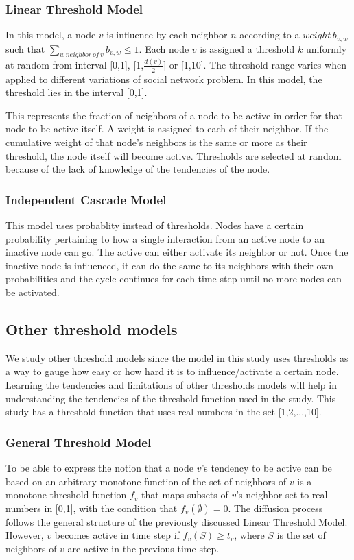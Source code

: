 \subsubsection{Linear Threshold Model}
In this model, a node $v$ is influence by each neighbor $n$ according to a $weight\, b_{v,w}$ such that $\sum_{w\, neighbor\, of\, v} b_{v,w}\leq{1}$.\cite{Kempe} Each node $v$ is assigned a threshold $k$ uniformly at random from interval [0,1], [1,$\frac{d(v)}{2}$] or [1,10].\cite{chen} The threshold range varies when applied to different variations of social network problem. In this model, the threshold lies in the interval [0,1]. 

This represents the fraction of neighbors of a node to be active in order for that node to be active itself.  A weight is assigned to each of their neighbor. If the cumulative weight of that node's neighbors is the same or more as their threshold, the node itself will become active. Thresholds are selected at random because of the lack of knowledge of the tendencies of the node.\cite{Kempe} 
\subsubsection{Independent Cascade Model}
This model uses probablity instead of thresholds. Nodes have a  certain probability pertaining to how a single interaction from an active node to an inactive node can go. The active can either activate its neighbor or not. Once the inactive node is influenced, it can do the same to its neighbors with their own probabilities and the cycle continues for each time step until no more nodes can be activated.\cite{Kempe}
\subsection{Other threshold models}
We study other threshold models since the model in this study uses thresholds as a way to gauge how easy or how hard it is to influence/activate a certain node. Learning the tendencies and limitations of other thresholds models will help in understanding the tendencies of the threshold function used in the study. This study has a threshold function that uses real numbers in the set [1,2,...,10].
\subsubsection{General Threshold Model}
To be able to express the notion that a node $v$'s tendency to be active can be based on an arbitrary monotone function of the set of neighbors of $v$ is a monotone threshold function $f_{v}$ that maps subsets of $v$'s neighbor set to real numbers in [0,1], with the condition that $f_{v}(\emptyset) = 0$. The diffusion process follows the general structure of the previously discussed Linear Threshold Model. However, $v$ becomes active in time step if $f_{v}(S) \geq t_{v}$, where $S$ is the set of neighbors of $v$ are active in the previous time step.\cite{Kempe}
